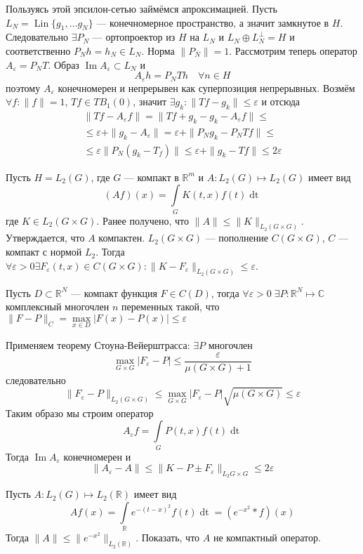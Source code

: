 \documentclass[12pt]{article}
\renewcommand{\Im}{\operatorname{Im}}
\DeclareMathOperator{\Lin}{Lin}
\begin{document}
\begin{Proof}
    Пользуясь этой эпсилон-сетью займёмся апроксимацией.
    Пусть $L_N = \Lin \{g_1,\dots g_N\}$ --- конечномерное пространство, а
    значит замкнутое в $H$.
    Следовательно $\exists P_N$ --- ортопроектор из $H$ на $L_N$ и 
    $L_N \oplus L_N^\perp = H$ и соответственно $P_N h = h_N \in L_N$.
    Норма $\|P_N\| = 1$.
    Рассмотрим теперь оператор $A_\varepsilon = P_N T$.
    Образ $\Im A_\varepsilon \subset L_N$ и
    $$
    A_\varepsilon h = P_N T h \quad \forall n \in H
    $$
    поэтому $A_\varepsilon$ конечномерен и непрерывен как суперпозиция 
    непрерывных.
    Возмём $\forall f\colon \|f\| = 1$, $Tf \in TB_1(0)$, значит
    $\exists g_k\colon \|Tf - g_k\| \le \varepsilon$ и отсюда
    \begin{multline*}
    \|Tf - A_\varepsilon f\| = \|Tf + g_k - g_k - A_\varepsilon f\| \le \\ \le
    \varepsilon + \|g_k - A_\varepsilon\| = \varepsilon + \|P_N g_k - P_N T f\|
    \le \\ \le\varepsilon  \|P_N(g_k - T_f)\| \le \varepsilon + \|g_k - Tf\| 
    \le 2 \varepsilon 
    \end{multline*}
\end{Proof}
\begin{Prim}
    Пусть $H = L_2(G)$, где $G$ --- компакт в $\mathbb R^m$ и $A : L_2(G)
    \mapsto L_2(G)$ имеет вид
    $$
    (Af)(x) = \int\limits_G K(t, x)f(t)\mathop{dt}
    $$
    где $K \in L_2(G \times G)$.
    Ранее получено, что $\|A\| \le \|K\|_{L_2(G \times G)}$.
    Утверждается, что $A$ компактен.
    $L_2(G \times G)$ --- пополнение $C(G \times G)$, $C$ --- компакт с нормой
    $L_2$.
    Тогда $\forall \varepsilon > 0 \exists F_\varepsilon(t, x) \in
    C(G \times G)\colon \|K - F_\varepsilon\|_{L_2(G \times G)} \le 
    \varepsilon$.
    \begin{Theor}
        Пусть $D \subset \mathbb R^N$ --- компакт функция $F \in C(D)$, тогда
        $\forall \varepsilon > 0\; \exists P : \mathbb R^N \mapsto \mathbb C$
        комплексный многочлен $n$ переменных такой, что
        $\|F - P\|_C = \max\limits_{x \in D} |F(x) - P(x)| \le \varepsilon$
    \end{Theor}
    
    Применяем теорему Стоуна-Вейерштрасса: $\exists P$ многочлен
    $$
    \max_{G \times G}|F_\varepsilon - P| \le \frac{\varepsilon}{\mu(G \times 
    G) + 1}
    $$
    следовательно
    $$
    \|F_\varepsilon - P\|_{L_2(G \times G)} \le \max_{G \times G}|F_\varepsilon 
    - P|\sqrt{\mu(G \times G)} \le \varepsilon
    $$
    Таким образо мы строим оператор
    $$
    A_\varepsilon f = \int \limits_G P(t, x) f(t) \mathop{dt}
    $$
    Тогда $\Im A_\varepsilon$ конечномерен и
    $$
    \|A_\varepsilon - A\| \le \|K - P \pm F_\varepsilon\|_{L_2{G \times G}} \le
    2 \varepsilon
    $$
\end{Prim}
\begin{Upr}
    Пусть $A : L_2(G) \mapsto L_2(\mathbb R)$ имеет вид
    $$
    Af(x) = \int\limits_{\mathbb R} e^{-(t - x)^2}f(t)\mathop{dt} = (e^{-x^2} *
    f)(x)
    $$
    Тогда $\|A\| \le \|e^{-x^2}\|_{L_2(\mathbb R)}$. 
    Показать, что $A$ не компактный оператор.
\end{Upr}
\end{document}

